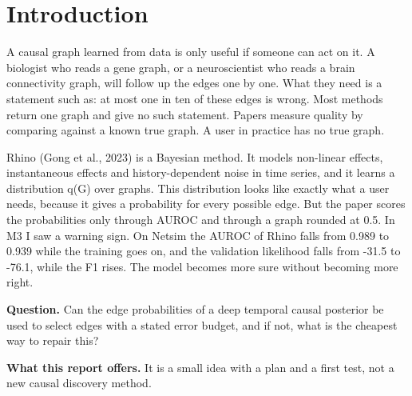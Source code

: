 \documentclass[10pt]{article}
\begin{document}
\section{Introduction}
A causal graph learned from data is only useful if someone can act on it. A biologist who reads a gene graph, or a neuroscientist who reads a brain connectivity graph, will follow up the edges one by one. What they need is a statement such as: at most one in ten of these edges is wrong. Most methods return one graph and give no such statement. Papers measure quality by comparing against a known true graph. A user in practice has no true graph.

Rhino (Gong et al., 2023) is a Bayesian method. It models non-linear effects, instantaneous effects and history-dependent noise in time series, and it learns a distribution q(G) over graphs. This distribution looks like exactly what a user needs, because it gives a probability for every possible edge. But the paper scores the probabilities only through AUROC and through a graph rounded at 0.5. In M3 I saw a warning sign. On Netsim the AUROC of Rhino falls from 0.989 to 0.939 while the training goes on, and the validation likelihood falls from -31.5 to -76.1, while the F1 rises. The model becomes more sure without becoming more right.

\textbf{Question.} Can the edge probabilities of a deep temporal causal posterior be used to select edges with a stated error budget, and if not, what is the cheapest way to repair this?

\textbf{What this report offers.} It is a small idea with a plan and a first test, not a new causal discovery method.
\end{document}
